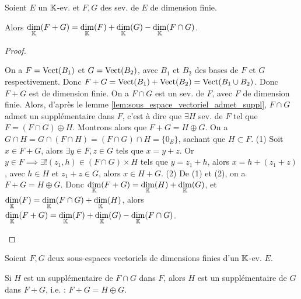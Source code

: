 \documentclass[12pt, a4paper]{report}
\begin{document}
\begin{theorem}
    Soient $E$ un $\mathbb{K}$-ev. et $F,G$ des sev. de $E$ de dimension finie.

    Alors $\underset{\mathbb{K}}\dim(F+G) = \underset{\mathbb{K}}\dim(F) + \underset{\mathbb{K}}\dim(G) - \underset{\mathbb{K}}\dim(F \cap G)$.
\end{theorem}

\begin{proof}
    \begin{outline}
        \1 On a $F= \mathrm{Vect}(B_1)$ et $G = \mathrm{Vect}(B_2)$, avec $B_1$ et $B_2$ des bases de $F$ et $G$ respectivement.
        \1 Donc $F+G = \mathrm{Vect}(B_1) + \mathrm{Vect}(B_2) = \mathrm{Vect}(B_1 \cup B_2)$.
        \1 Donc $F+G$ est de dimension finie.
        \1 On a $F \cap G$ est un sev. de $F$, avec $F$ de dimension finie.
        \1 Alors, d'après le lemme \ref{lem:sous_espace_vectoriel_admet_suppl}, $F \cap G$ admet un supplémentaire dans $F$, c'est à dire que $\exists H$ sev. de $F$ tel que $F = (F \cap G) \oplus H$.
        \1 Montrons alors que $F+G = H \oplus G$.
        \2 On a $G \cap H = G \cap (F \cap H) = (F \cap G) \cap H = \{0_E\}$, sachant que $H \subset F$. (1)
        \2 Soit $x \in F+G$, alors $\exists y \in F, z \in G$ tels que $x = y+z$.
        \2 Or $y \in F \implies \exists ! (z_1,h) \in (F\cap G)\times H$ tels que $y = z_1 + h$, alors $x = h + (z_1 + z)$, avec $h \in H$ et $z_1 + z \in G$, alors $x \in H + G$. (2)
        \2 De (1) et (2), on a $F+G = H \oplus G$.
        \1 Donc $\underset{\mathbb{K}}\dim(F+G) = \underset{\mathbb{K}}\dim(H) + \underset{\mathbb{K}}\dim(G)$, et $\underset{\mathbb{K}}\dim(F) = \underset{\mathbb{K}}\dim(F \cap G) + \underset{\mathbb{K}}\dim(H)$, alors $\underset{\mathbb{K}}\dim(F+G) = \underset{\mathbb{K}}\dim(F) + \underset{\mathbb{K}}\dim(G) - \underset{\mathbb{K}}\dim(F \cap G)$.
    \end{outline}
\end{proof}

\begin{remark}
    Soient $F,G$ deux sous-espaces vectoriels de dimensions finies d'un $\mathbb{K}$-ev. $E$.

    Si $H$ est un supplémentaire de $F\cap G$ dans $F$, alors $H$ est un supplémentaire de $G$ dans $F+G$, i.e. : $F+G = H \oplus G$.
\end{remark}
\end{document}
